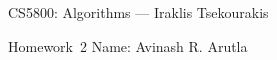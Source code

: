 \documentclass[11pt]{article}
\newcommand{\yourname}{Avinash R. Arutla}
\theoremstyle{definition}
\newcommand{\instructor}{Iraklis Tsekourakis}
\newcommand{\hwnum}{2}
\newtheorem{prob}{}
\newcommand{\solution}{\medskip\noindent{\color{DarkBlue}\textbf{Solution:}}}
\begin{document}
{\Large
\begin{center}{CS5800: Algorithms} --- \instructor \end{center}}
{\large
\vspace{10pt}
\noindent Homework~\hwnum \vspace{2pt}%
}
\bigskip
{\large \noindent Name: \yourname }
\vspace{15pt}




\end{document}
